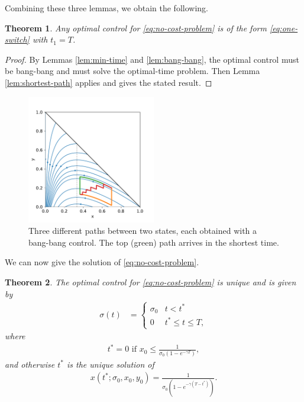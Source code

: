 \documentclass[english,12pt,letter]{article}
\newtheorem{thm}{Theorem}
\newcommand{\Rnot}{\sigma_0}
\begin{document}
Combining these three lemmas, we obtain the following.
\begin{thm} \label{thm:one-switch}
    Any optimal control for \eqref{eq:no-cost-problem} is of the form \eqref{eq:one-switch}
    with $t_1=T$.
\end{thm}
\begin{proof}
    By Lemmas \ref{lem:min-time} and \ref{lem:bang-bang}, the optimal control must be bang-bang and must solve
    the optimal-time problem.  Then Lemma \ref{lem:shortest-path} applies and gives the stated result.
\end{proof}

\begin{figure}
    \centering
    \includegraphics[width=0.5\textwidth]{figures/threepaths.pdf}
    \caption{Three different paths between two states, each obtained
    with a bang-bang control.  The top (green) path arrives in the shortest time.\label{fig:bangbangtraj}}
\end{figure}
We can now give the solution of \eqref{eq:no-cost-problem}.
\begin{thm} \label{thm:no-cost}
The optimal control for \eqref{eq:no-cost-problem} is unique and is given by
\begin{align}
    \sigma(t) & = \begin{cases}  
        \Rnot & t<t^* \\
        0 & t^* \le  t \le T,
    \end{cases}
\end{align}
where 
\begin{align} \label{eq:dropcond}
    t^*=0 \text{ if } x_0\le\frac{1}{\sigma_0(1-e^{-\gamma T})},
\end{align}
and otherwise $t^*$ is the unique solution of
\begin{align} \label{xtstar}
    x(t^*;\Rnot,x_0,y_0) = \frac{1}{\sigma_0(1-e^{-\gamma(T-t^*)})}.
\end{align}
\end{thm}
\end{document}
